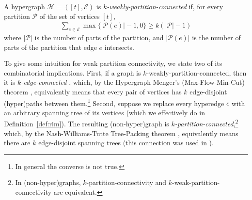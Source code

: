 \documentclass{article}[11pt]
\begin{document}
\begin{definition}
  A hypergraph $\mathcal{H}=([t],\mathcal{E})$ is \emph{$k$-weakly-partition-connected} if, for every partition $\mathcal{P}$ of the set of vertices $[t]$,
  \begin{align}
  \sum_{e\in \mathcal{E}}{\max\{|\mathcal{P}(e)| - 1, 0\}} \ge k(|\mathcal{P}|-1)
    \label{eq:wpc}
  \end{align}
  where $|\mathcal{P}|$ is the number of parts of the partition, and $|\mathcal{P}(e)|$ is the number of parts of the partition that edge $e$ intersects.
\end{definition}

To give some intuition for weak partition connectivity, we state two of its combinatorial implications. First, if a graph is $k$-weakly-partition-connected, then it is \emph{$k$-edge-connected} \cite{Kiraly03}, which, by the Hypergraph Menger's (Max-Flow-Min-Cut) theorem \cite[Theorem 1.11]{Kiraly03}, equivalently means that every pair of vertices has $k$ edge-disjoint (hyper)paths between them.\footnote{In general the converse is not true.}
Second, suppose we replace every hyperedge $e$ with an arbitrary spanning tree of its vertices (which we effectively do in Definition~\ref{def:rim}).
The resulting (non-hyper)graph is \emph{$k$-partition-connected},\footnote{In (non-hyper)graphs, $k$-partition-connectivity and $k$-weak-partition-connectivity are equivalent.} which, by the Nash-Williams-Tutte Tree-Packing theorem \cite{nash1961edge,tutte1961problem}, equivalently means there are $k$ edge-disjoint spanning trees (this connection was used in \cite{GLSTW21}).
\end{document}
